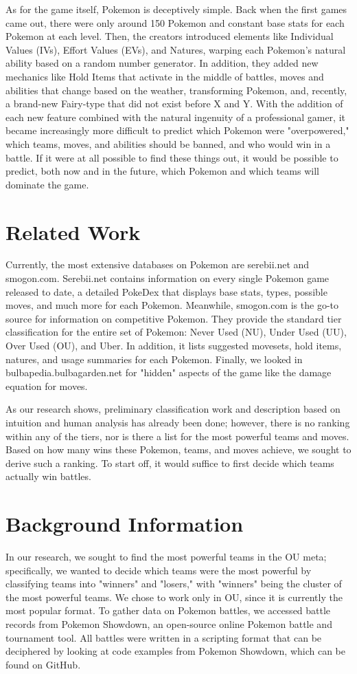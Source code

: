 \documentclass{acm_proc_article-sp}
\begin{document}
As for the game itself, Pokemon is deceptively simple. Back when the first games came out, there were only around 150 Pokemon and constant base stats for each Pokemon at each level. Then, the creators introduced elements like Individual Values (IVs), Effort Values (EVs), and Natures, warping each Pokemon's natural ability based on a random number generator. In addition, they added new mechanics like Hold Items that activate in the middle of battles, moves and abilities that change based on the weather, transforming Pokemon, and, recently, a brand-new Fairy-type that did not exist before X and Y. With the addition of each new feature combined with the natural ingenuity of a professional gamer, it became increasingly more difficult to predict which Pokemon were "overpowered," which teams, moves, and abilities should be banned, and who would win in a battle. If it were at all possible to find these things out, it would be possible to predict, both now and in the future, which Pokemon and which teams will dominate the game.

\section{Related Work}
Currently, the most extensive databases on Pokemon are serebii.net and smogon.com. Serebii.net contains information on every single Pokemon game released to date, a detailed PokeDex that displays base stats, types, possible moves, and much more for each Pokemon. Meanwhile, smogon.com is the go-to source for information on competitive Pokemon. They provide the standard tier classification for the entire set of Pokemon: Never Used (NU), Under Used (UU), Over Used (OU), and Uber. In addition, it lists suggested movesets, hold items, natures, and usage summaries for each Pokemon. Finally, we looked in bulbapedia.bulbagarden.net for "hidden" aspects of the game like the damage equation for moves.
	
As our research shows, preliminary classification work and description based on intuition and human analysis has already been done; however, there is no ranking within any of the tiers, nor is there a list for the most powerful teams and moves. Based on how many wins these Pokemon, teams, and moves achieve, we sought to derive such a ranking. To start off, it would suffice to first decide which teams actually win battles.

\section{Background Information}
In our research, we sought to find the most powerful teams in the OU meta; specifically, we wanted to decide which teams were the most powerful by classifying teams into "winners" and "losers," with "winners" being the cluster of the most powerful teams. We chose to work only in OU, since it is currently the most popular format. To gather data on Pokemon battles, we accessed battle records from Pokemon Showdown, an open-source online Pokemon battle and tournament tool. All battles were written in a scripting format that can be deciphered by looking at code examples from Pokemon Showdown, which can be found on GitHub.
\end{document}
